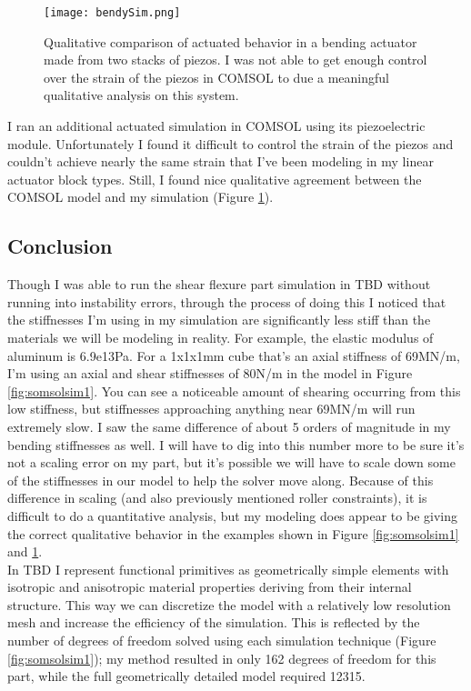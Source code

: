 {\begin{figure}
  \texttt{[image: bendySim.png]}
  \caption{Qualitative comparison of actuated behavior in a bending actuator made from two stacks of piezos.  I was not able to get enough control over the strain of the piezos in COMSOL to due a meaningful qualitative analysis on this system.}
  \label{fig:bendSim}
\end{figure}

I ran an additional actuated simulation in COMSOL using its piezoelectric module.  Unfortunately I found it difficult to control the strain of the piezos and couldn't achieve nearly the same strain that I've been modeling in my linear actuator block types.  Still, I found nice qualitative agreement between the COMSOL model and my simulation (Figure \ref{fig:bendSim}). 

\subsection{Conclusion}

Though I was able to run the shear flexure part simulation in TBD without running into instability errors, through the process of doing this I noticed that the stiffnesses I'm using in my simulation are significantly less stiff than the materials we will be modeling in reality.  For example, the elastic modulus of aluminum is 6.9e13Pa.  For a 1x1x1mm cube that's an axial stiffness of 69MN/m, I'm using an axial and shear stiffnesses of 80N/m in the model in Figure \ref{fig:somsolsim1}.  You can see a noticeable amount of shearing occurring from this low stiffness, but stiffnesses approaching anything near 69MN/m will run extremely slow.  I saw the same difference of about 5 orders of magnitude in my bending stiffnesses as well.  I will have to dig into this number more to be sure it's not a scaling error on my part, but it's possible we will have to scale down some of the stiffnesses in our model to help the solver move along.  Because of this difference in scaling (and also previously mentioned roller constraints), it is difficult to do a quantitative analysis, but my modeling does appear to be giving the correct qualitative behavior in the examples shown in Figure \ref{fig:somsolsim1} and \ref{fig:bendSim}.\\

In TBD I represent functional primitives as geometrically simple elements with isotropic and anisotropic material properties deriving from their internal structure.  This way we can discretize the model with a relatively low resolution mesh and increase the efficiency of the simulation.  This is reflected by the number of degrees of freedom solved using each simulation technique (Figure \ref{fig:somsolsim1}); my method resulted in only 162 degrees of freedom for this part, while the full geometrically detailed model required 12315.\\

}
